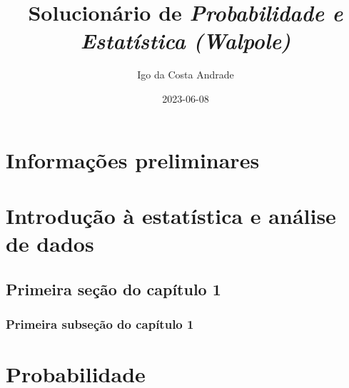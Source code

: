 \documentclass[
]{article}
\title{Solucionário de \emph{Probabilidade e Estatística (Walpole)}}
\author{Igo da Costa Andrade}
\date{2023-06-08}
\begin{document}
\maketitle

{
\setcounter{tocdepth}{2}
\tableofcontents
}
\newpage

\hypertarget{informauxe7uxf5es-preliminares}{%
\section*{Informações preliminares}\label{informauxe7uxf5es-preliminares}}

\hypertarget{introduuxe7uxe3o-uxe0-estatuxedstica-e-anuxe1lise-de-dados}{%
\section{Introdução à estatística e análise de dados}\label{introduuxe7uxe3o-uxe0-estatuxedstica-e-anuxe1lise-de-dados}}

\hypertarget{primeira-seuxe7uxe3o-do-capuxedtulo-1}{%
\subsection{Primeira seção do capítulo 1}\label{primeira-seuxe7uxe3o-do-capuxedtulo-1}}

\hypertarget{primeira-subseuxe7uxe3o-do-capuxedtulo-1}{%
\subsubsection{Primeira subseção do capítulo 1}\label{primeira-subseuxe7uxe3o-do-capuxedtulo-1}}

\hypertarget{probabilidade}{%
\section{Probabilidade}\label{probabilidade}}
\end{document}
